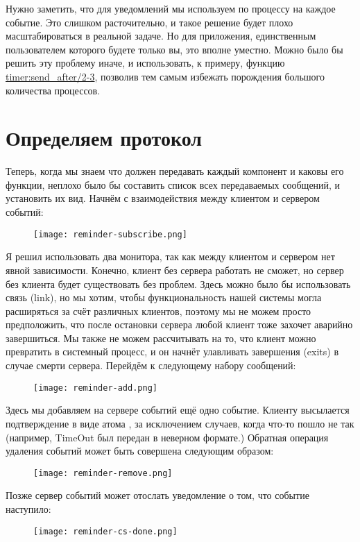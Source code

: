 Нужно заметить, что для уведомлений мы используем по процессу на каждое событие.
Это слишком расточительно, и такое решение будет плохо масштабироваться в реальной задаче.
Но для приложения, единственным пользователем которого будете только вы, это вполне уместно.
Можно было бы решить эту проблему иначе, и использовать, к примеру, функцию \href{http://erldocs.com/R15B/stdlib/timer.html\#send_after/2}{timer:send\_after/2-3}, позволив тем самым избежать порождения большого количества процессов.
\clearpage
\section{Определяем протокол}
\label{defining-the-protocol}
Теперь, когда мы знаем что должен передавать каждый компонент и каковы его функции, неплохо было бы составить список всех передаваемых сообщений, и установить их вид.
Начнём с взаимодействия между клиентом и сервером событий:
\begin{figure}[h!]
    \centering
    \texttt{[image: reminder-subscribe.png]}
\end{figure}

Я решил использовать два монитора, так как между клиентом и сервером нет явной зависимости.
Конечно, клиент без сервера работать не сможет, но сервер без клиента будет существовать без проблем.
Здесь можно было бы использовать связь (link), но мы хотим, чтобы функциональность нашей системы могла расширяться за счёт различных клиентов, поэтому мы не можем просто предположить, что после остановки сервера любой клиент тоже захочет аварийно завершиться.
Мы также не можем рассчитывать на то, что клиент можно превратить в системный процесс, и он начнёт улавливать завершения (exits) в случае смерти сервера.
Перейдём к следующему набору сообщений:
\begin{figure}[h!]
    \centering
    \texttt{[image: reminder-add.png]}
\end{figure}

Здесь мы добавляем на сервере событий ещё одно событие.
Клиенту высылается подтверждение в виде атома , за исключением случаев, когда что\--то пошло не так (например, TimeOut был передан в неверном формате.)
Обратная операция удаления событий может быть совершена следующим образом:
\begin{figure}[h!]
    \centering
    \texttt{[image: reminder-remove.png]}
\end{figure}

Позже сервер событий может отослать уведомление о том, что событие наступило:
\begin{figure}[h!]
    \centering
    \texttt{[image: reminder-cs-done.png]}
\end{figure}

